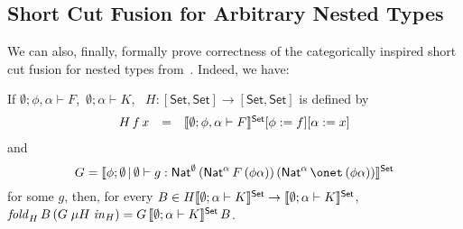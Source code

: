 \documentclass{lmcs}
\theoremstyle{plain}\newtheorem{satz}[thm]{Satz}
\newcommand{\set}{\mathsf{Set}}
\begin{document}
\subsection{Short Cut Fusion for Arbitrary Nested
  Types}\label{sec:short-cut-nested} 


We can also, finally, formally prove correctness of the categorically
inspired short cut fusion for nested types from~\cite{jg10}. Indeed,
we have:
\begin{thm}\label{thm:short-cut-nested}
If $\emptyset;\phi,\alpha \vdash F$, \,$\emptyset; \alpha
\vdash K$, \,
$H : [\set,\set] \to [\set,\set]$ is defined by
\[\begin{array}{lll}
H\,f\,x & = & \setsem{\emptyset; \phi, \alpha \vdash F}[\phi :=
  f][\alpha := x]\\
\end{array}\]
and 
\[G = \setsem{\phi;\emptyset\,|\,\emptyset \vdash g :
\Nat^\emptyset\,(\Nat^\alpha\,F\,(\phi\alpha))\,(\Nat^\alpha\,\onet \,
(\phi\alpha))}\] for some $g$, then, for every $B \in H
\setsem{\emptyset;\alpha \vdash K} \rightarrow \setsem{\emptyset;
  \alpha \vdash K}$,
$\mathit{fold}_{H}\, B \, (G\; \mu H \; \mathit{in}_{H}) = G
\,\setsem{\emptyset;\alpha \vdash K}\, B$.
\end{thm}
\end{document}
